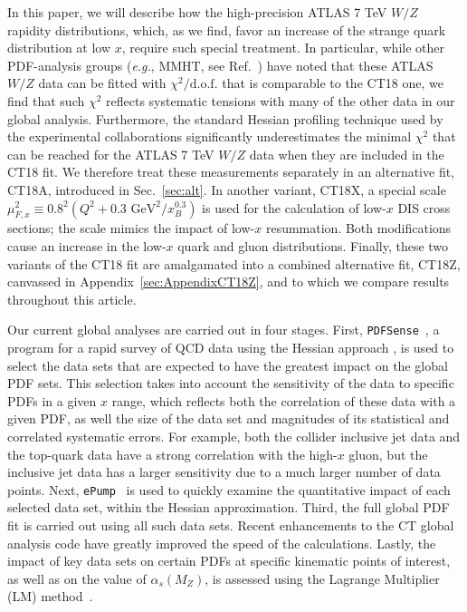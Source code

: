 In this paper, we will describe how the high-precision ATLAS 7 TeV $W/Z$ rapidity distributions, which, as we find, favor an increase of the strange quark distribution at low $x$,
require such special treatment. In particular, while other PDF-analysis groups ({\it e.g.}, MMHT, see Ref.~\cite{Thorne:2019mpt}) have noted that these ATLAS $W/Z$ data can be fitted with 
$\chi^2/\mathrm{d.o.f.}$ that is comparable to the CT18 one, we find that such $\chi^2$ reflects systematic tensions with many of the other data in our global analysis.
%
%
Furthermore, the standard Hessian profiling technique used by the experimental collaborations significantly underestimates the minimal $\chi^2$ that can be reached for the ATLAS 7 TeV $W/Z$ data when they are included in the CT18 fit.
%
We therefore treat these measurements separately in an alternative fit, CT18A, introduced in Sec.~\ref{sec:alt}.
%
In another variant, CT18X, a special scale $\mu^2_{F,x} \equiv 0.8^2 \left(Q^2 + 0.3\mbox{ GeV}^2/x_B^{0.3}\right)$ is used for the calculation of low-$x$ DIS cross sections; the scale mimics the impact of low-$x$ resummation. Both modifications cause an increase in the low-$x$ quark and gluon distributions. Finally, these two variants of the CT18 fit are
amalgamated into a combined alternative fit, CT18Z, canvassed in Appendix~\ref{sec:AppendixCT18Z}, and to which we compare results throughout this article.
%
%
%

Our current global analyses are carried out in four stages. First, \texttt{PDFSense}~\cite{Wang:2018heo,Hobbs:2019gob}, a program for a rapid survey of QCD data using the Hessian
approach \cite{Pumplin:2001ct,Pumplin:2002vw}, is used to select the  data sets that are expected to have the greatest impact on the global PDF sets. This selection takes into account the sensitivity of the data to specific PDFs in a given $x$ range, 
which reflects both the correlation of these data with a given PDF, as well the size of the data set and magnitudes of its statistical
and correlated systematic errors. For example, both the collider inclusive jet data and the top-quark data have a strong correlation with the high-$x$ gluon,
but the inclusive jet data has a larger sensitivity due to a much larger number of data points. Next, \texttt{ePump}~\cite{Schmidt:2018hvu,Hou:2019gfw} is used to quickly examine the quantitative
impact of each selected data set, within the Hessian approximation. Third, the full global PDF fit is carried out using all such data sets. Recent enhancements to the CT global analysis code have
greatly improved the speed of the calculations. Lastly, the impact of key data sets on certain PDFs at specific kinematic points of interest, as well as on the value of $\alpha_s(M_Z)$,
is assessed using the Lagrange Multiplier (LM) method~\cite{Stump:2001gu}. 

